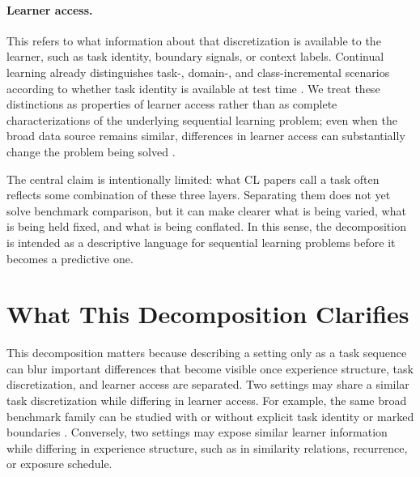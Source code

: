 \documentclass{article} %
\begin{document}
\paragraph{Learner access.}
This refers to what information about that discretization is available to the learner, such as task identity, boundary signals, or context labels. Continual learning already distinguishes task-, domain-, and class-incremental scenarios according to whether task identity is available at test time \citep{vandeven2019three,van2022three}. We treat these distinctions as properties of learner access rather than as complete characterizations of the underlying sequential learning problem; even when the broad data source remains similar, differences in learner access can substantially change the problem being solved \citep{van_de_Ven_2025}.


The central claim is intentionally limited: what CL papers call a task often reflects some combination of these three layers. Separating them does not yet solve benchmark comparison, but it can make clearer what is being varied, what is being held fixed, and what is being conflated. In this sense, the decomposition is intended as a descriptive language for sequential learning problems before it becomes a predictive one.



\section{What This Decomposition Clarifies}
This decomposition matters because describing a setting only as a task sequence can blur important differences that become visible once experience structure, task discretization, and learner access are separated. Two settings may share a similar task discretization while differing in learner access. For example, the same broad benchmark family can be studied with or without explicit task identity or marked boundaries \citep{van2022three,van_de_Ven_2025}. Conversely, two settings may expose similar learner information while differing in experience structure, such as in similarity relations, recurrence, or exposure schedule.
\end{document}
